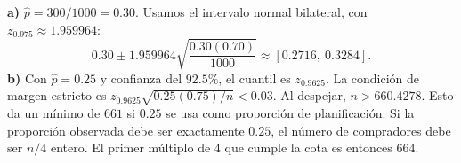 \textbf{a)} $\hat p=300/1000=0.30$. Usamos el intervalo normal
bilateral, con $z_{0.975}\approx1.959964$:
\[
0.30\pm1.959964\sqrt{\frac{0.30(0.70)}{1000}}
\approx\boxed{[0.2716,\ 0.3284]}.
\]
\textbf{b)} Con $\hat p=0.25$ y confianza del $92.5\%$,
el cuantil es $z_{0.9625}$. La condición de margen estricto es
$z_{0.9625}\sqrt{0.25(0.75)/n}<0.03$.
Al despejar, $n>660.4278$. Esto da un mínimo de
$\boxed{661}$ si $0.25$ se usa como proporción de planificación.
Si la proporción observada debe ser exactamente $0.25$, el número
de compradores debe ser $n/4$ entero. El primer múltiplo de 4
que cumple la cota es entonces $\boxed{664}$.
